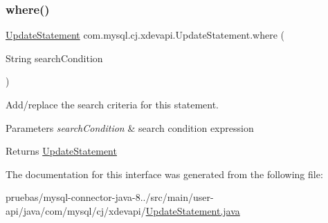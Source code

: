\subsubsection{\texorpdfstring{where()}{where()}}
{\footnotesize\ttfamily \mbox{\hyperlink{interfacecom_1_1mysql_1_1cj_1_1xdevapi_1_1_update_statement}{Update\+Statement}} com.\+mysql.\+cj.\+xdevapi.\+Update\+Statement.\+where (\begin{DoxyParamCaption}\item[{String}]{search\+Condition }\end{DoxyParamCaption})}

Add/replace the search criteria for this statement.


\begin{DoxyParams}{Parameters}
{\em search\+Condition} & search condition expression \\
\hline
\end{DoxyParams}
\begin{DoxyReturn}{Returns}
\mbox{\hyperlink{interfacecom_1_1mysql_1_1cj_1_1xdevapi_1_1_update_statement}{Update\+Statement}} 
\end{DoxyReturn}


The documentation for this interface was generated from the following file\+:\begin{DoxyCompactItemize}
\item 
pruebas/mysql-\/connector-\/java-\/8../src/main/user-\/api/java/com/mysql/cj/xdevapi/\mbox{\hyperlink{_update_statement_8java}{Update\+Statement.\+java}}\end{DoxyCompactItemize}
